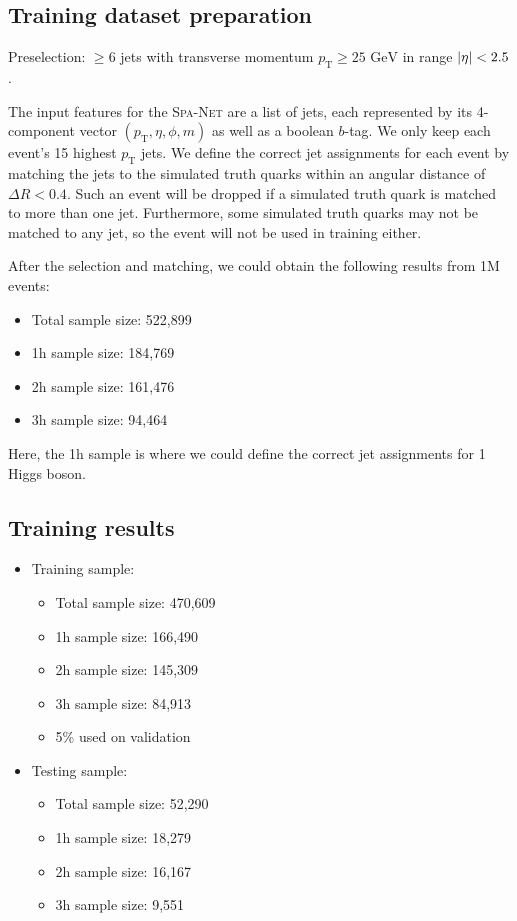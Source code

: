 \documentclass[12pt]{article}
\begin{document}
    \subsection{Training dataset preparation}%
    \label{sub:training_dataset_preparation}
        Preselection: $\ge 6$ jets with transverse momentum $p_{\text{T}} \ge \text{25 GeV}$ in range $\abs{\eta} < 2.5$.

        The input features for the \textsc{Spa-Net} are a list of jets, each represented by its 4-component vector $(p_\text{T}, \eta, \phi, m)$ as well as a boolean $b$-tag. We only keep each event's 15 highest $p_\text{T}$ jets. We define the correct jet assignments for each event by matching the jets to the simulated truth quarks within an angular distance of $\Delta R < 0.4$. Such an event will be dropped if a simulated truth quark is matched to more than one jet. Furthermore, some simulated truth quarks may not be matched to any jet, so the event will not be used in training either.

        After the selection and matching, we could obtain the following results from 1M events:
        \begin{itemize}
            \item Total sample size: 522,899
            \item 1h sample size: 184,769
            \item 2h sample size: 161,476
            \item 3h sample size: 94,464
        \end{itemize}
        Here, the 1h sample is where we could define the correct jet assignments for 1 Higgs boson.
    \subsection{Training results}%
    \label{sub:training_results}
        \begin{itemize}
            \item Training sample:
            \begin{itemize}
                \item Total sample size: 470,609
                \item 1h sample size: 166,490
                \item 2h sample size: 145,309
                \item 3h sample size: 84,913
                \item 5\% used on validation
            \end{itemize}
            \item Testing sample:
            \begin{itemize}
                \item Total sample size: 52,290
                \item 1h sample size: 18,279
                \item 2h sample size: 16,167
                \item 3h sample size: 9,551
            \end{itemize}
        \end{itemize}
\end{document}
